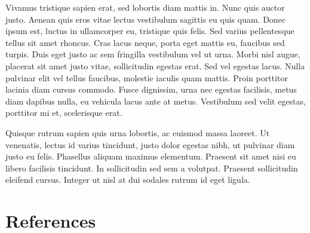 \begin{refsection}
Vivamus tristique sapien erat, sed lobortis diam mattis in. Nunc quis auctor justo. Aenean quis eros vitae lectus vestibulum sagittis eu quis quam. Donec ipsum est, luctus in ullamcorper eu, tristique quis felis. Sed varius pellentesque tellus sit amet rhoncus. Cras lacus neque, porta eget mattis eu, faucibus sed turpis. Duis eget justo ac sem fringilla vestibulum vel ut urna. Morbi nisl augue, placerat sit amet justo vitae, sollicitudin egestas erat. Sed vel egestas lacus. Nulla pulvinar elit vel tellus faucibus, molestie iaculis quam mattis. Proin porttitor lacinia diam cursus commodo. Fusce dignissim, urna nec egestas facilisis, metus diam dapibus nulla, eu vehicula lacus ante at metus. Vestibulum sed velit egestas, porttitor mi et, scelerisque erat.

Quisque rutrum sapien quis urna lobortis, ac euismod massa laoreet. Ut venenatis, lectus id varius tincidunt, justo dolor egestas nibh, ut pulvinar diam justo eu felis. Phasellus aliquam maximus elementum. Praesent sit amet nisi eu libero facilisis tincidunt. In sollicitudin sed sem a volutpat. Praesent sollicitudin eleifend cursus. Integer ut nisl at dui sodales rutrum id eget ligula.

\newpage
\section{References}
\printbibliography[heading=none]

\end{refsection}